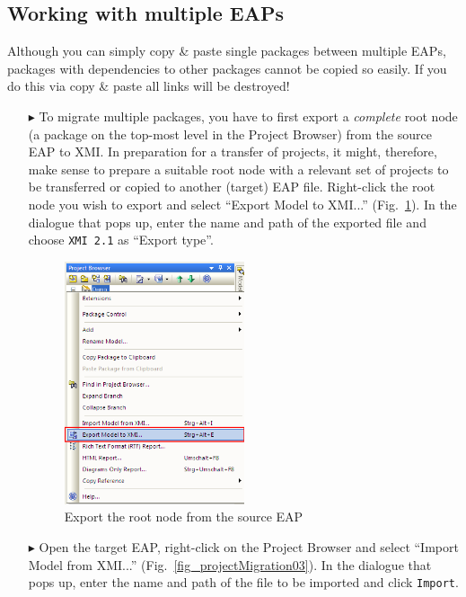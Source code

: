 \subsection{Working with multiple EAPs}

Although you can simply copy \& paste single packages between multiple EAPs, packages with dependencies to other packages cannot be copied so easily.
If you do this via copy \& paste all links will be destroyed!

\begin{enumerate}
\item[$\blacktriangleright$] To migrate multiple packages, you have to first export a \emph{complete} root node (a package on the top-most level in the Project
Browser) from the source EAP to XMI. In preparation for a transfer of projects, it might, therefore, make sense to prepare a suitable root node with a relevant
set of projects to be transferred or copied to another (target) EAP file. Right-click the root node you wish to export and select ``Export Model to XMI...''
(Fig.~\ref{fig_projectMigration01}). In the dialogue that pops up, enter the name and path of the exported file and choose \texttt{XMI 2.1} as ``Export type''.

\begin{figure}[htbp]
\begin{center}
  \includegraphics[width=0.5\textwidth]{projectMigration1}
  \caption{Export the root node from the source EAP}
  \label{fig_projectMigration01}
\end{center}
\end{figure}

\item[$\blacktriangleright$] Open the target EAP, right-click on the Project Browser and select ``Import Model from XMI...'' (Fig.~\ref{fig_projectMigration03}).
In the dialogue that pops up, enter the name and path of the file to be imported and click \texttt{Import}.


\end{enumerate}
